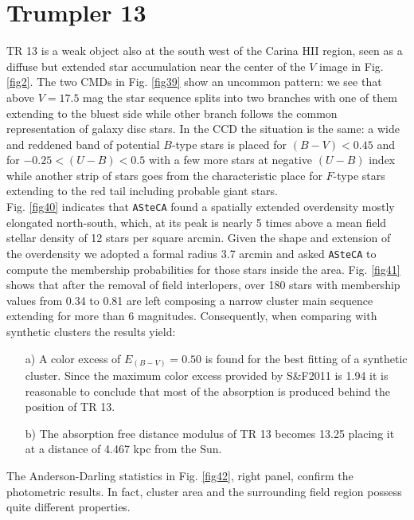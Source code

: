\documentclass{aa}
\begin{document}
\section{Trumpler 13}

TR 13 is a weak object also at the south west of the Carina HII
region, seen as a diffuse but extended star accumulation near the center of the
$V$ image in Fig. \ref{fig2}. The two CMDs in Fig. \ref{fig39} show an uncommon
pattern: we see that above $V = 17.5$ mag the star sequence splits into two
branches with one of them extending to the bluest side while other branch
follows the common representation of galaxy disc stars.
In the CCD the situation is the same: a
wide and reddened band of potential $B$-type stars is placed for $(B-V)<0.45$
and for $-0.25<(U-B)<0.5$ with a few more stars at negative $(U-B)$ index
while another strip of stars goes from the characteristic place for $F$-type
stars extending to the red tail including probable giant stars.\\

Fig. \ref{fig40} indicates that \texttt{ASteCA} found a spatially extended
overdensity mostly elongated north-south, which, at its peak is nearly 5 times
above a mean field stellar density of 12 stars per square arcmin. Given the
shape and extension of the overdensity we adopted a formal radius 3.7 arcmin and
asked \texttt{ASteCA} to compute the membership probabilities for those stars
inside the area. Fig. \ref{fig41} shows that after the removal of field
interlopers, over 180 stars with membership values from 0.34 to 0.81 are left
composing a narrow cluster main sequence extending for more than 6 magnitudes.
Consequently, when comparing with synthetic clusters the results yield:

\begin{itemize}
\item [a)] A color excess of $E_{(B-V)}= 0.50$ is found for the best fitting of a
    synthetic cluster. Since the maximum color excess provided by S\&F2011
    is 1.94 it is reasonable to conclude that most of the absorption is produced
    behind the position of TR 13.
\item [b)] The absorption free distance modulus of TR 13 becomes 13.25
    placing it at a distance of 4.467 kpc from the Sun.
\end{itemize}

The Anderson-Darling statistics in Fig. \ref{fig42}, right panel, confirm the
photometric results. In fact, cluster area and the surrounding field region
possess quite different properties.\\
\end{document}

